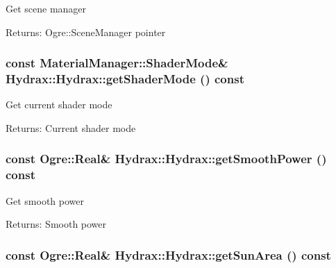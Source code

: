 Get scene manager \begin{Desc}
\item[Returns:]Ogre::SceneManager pointer \end{Desc}
\hypertarget{class_hydrax_1_1_hydrax_a3ca4b94a8cfb1aed6e3a997dc9fac7e}{
\subsubsection[{getShaderMode}]{\setlength{\rightskip}{0pt plus 5cm}const {\bf MaterialManager::ShaderMode}\& Hydrax::Hydrax::getShaderMode () const}}
\label{class_hydrax_1_1_hydrax_a3ca4b94a8cfb1aed6e3a997dc9fac7e}


Get current shader mode \begin{Desc}
\item[Returns:]Current shader mode \end{Desc}
\hypertarget{class_hydrax_1_1_hydrax_aae88f80029fa6fd3b11e646ae740cd3}{
\subsubsection[{getSmoothPower}]{\setlength{\rightskip}{0pt plus 5cm}const Ogre::Real\& Hydrax::Hydrax::getSmoothPower () const}}
\label{class_hydrax_1_1_hydrax_aae88f80029fa6fd3b11e646ae740cd3}


Get smooth power \begin{Desc}
\item[Returns:]Smooth power \end{Desc}
\hypertarget{class_hydrax_1_1_hydrax_881b74b5c9a3c830317174cf610d6867}{
\subsubsection[{getSunArea}]{\setlength{\rightskip}{0pt plus 5cm}const Ogre::Real\& Hydrax::Hydrax::getSunArea () const}}
\label{class_hydrax_1_1_hydrax_881b74b5c9a3c830317174cf610d6867}


